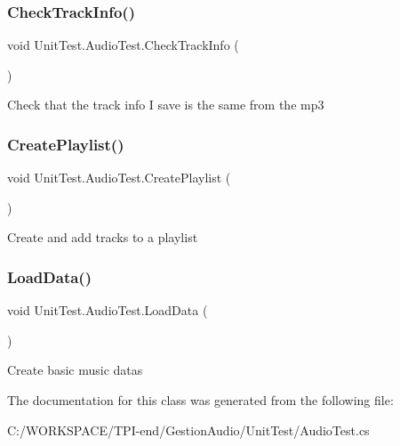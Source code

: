 \subsubsection{\texorpdfstring{Check\+Track\+Info()}{CheckTrackInfo()}}
{\footnotesize\ttfamily void Unit\+Test.\+Audio\+Test.\+Check\+Track\+Info (\begin{DoxyParamCaption}{ }\end{DoxyParamCaption})}



Check that the track info I save is the same from the mp3 

\mbox{\label{class_unit_test_1_1_audio_test_a6f1473adeea374f0d01e0c78bbfe4c02}} 
\subsubsection{\texorpdfstring{Create\+Playlist()}{CreatePlaylist()}}
{\footnotesize\ttfamily void Unit\+Test.\+Audio\+Test.\+Create\+Playlist (\begin{DoxyParamCaption}{ }\end{DoxyParamCaption})}



Create and add tracks to a playlist 

\mbox{\label{class_unit_test_1_1_audio_test_a8991e38cfa40fab3ae4b2ae355ac2738}} 
\subsubsection{\texorpdfstring{Load\+Data()}{LoadData()}}
{\footnotesize\ttfamily void Unit\+Test.\+Audio\+Test.\+Load\+Data (\begin{DoxyParamCaption}{ }\end{DoxyParamCaption})}



Create basic music datas 



The documentation for this class was generated from the following file\+:\begin{DoxyCompactItemize}
\item 
C\+:/\+W\+O\+R\+K\+S\+P\+A\+C\+E/\+T\+P\+I-\/end/\+Gestion\+Audio/\+Unit\+Test/Audio\+Test.\+cs\end{DoxyCompactItemize}
